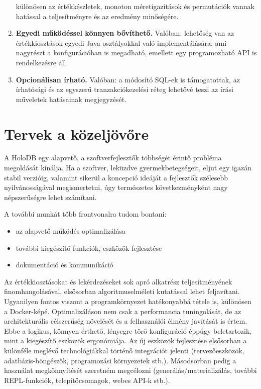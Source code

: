 \documentclass[
    parspace,
    noindent,
    nohyp,
]{elteiktdk}[2023/04/10]
\begin{document}
\begin{enumerate}
          különösen az értékkészletek, monoton méretigazítások és permutációk
          vannak hatással a teljesítményre és az eredmény minőségére.
    \item \textbf{Egyedi működéssel könnyen bővíthető.} Valóban:
          lehetőség van az értékkiosztások egyedi Java osztályokkal való implementálására,
          ami nagyrészt a konfigurációban is megadható,
          emellett egy programozható API is rendelkezésre áll.
    \item \textbf{Opcionálisan írható.} Valóban:
          a módosító SQL-ek is támogatottak,
          az írhatósági és az egyszerű tranzakciókezelési réteg
          lehetővé teszi az írási műveletek hatásainak megjegyzését.
\end{enumerate}


\section{Tervek a közeljövőre}

A HoloDB egy alapvető, a szoftverfejlesztők többségét érintő probléma megoldását kínálja.
Ha a szoftver, leküzdve gyermekbetegségeit, eljut egy igazán stabil verzióig,
valamint sikerül a koncepció ideáját a fejlesztők szélesebb nyilvánosságával megismertetni,
úgy természetes következményként nagy népszerűségre lehet számítani.

A további munkát több frontvonalra tudom bontani:

\begin{itemize}
    \item az alapvető működés optimalizálása
    \item további kiegészítő funkciók, eszközök fejlesztése
    \item dokumentáció és kommunikáció
\end{itemize}

Az értékkiosztásokat és lekérdezéseket sok apró alkatrész teljesítményének finomhangolásával,
elsősorban algoritmuselméleti kutatással lehet feljavítani.
Ugyanilyen fontos viszont a programkörnyezet hatékonyabbá tétele is,
különösen a Docker-képé.
Optimalizáláson nem csak a performancia tuningolását,
de az architekturális célszerűség növelését és a felhasználói élmény javítását is értem.
Ebbe a logikus, könnyen érthető, lényegre törő konfiguráció éppúgy beletartozik,
mint a kiegészítő eszközök ergonómiája.
Az új eszközök fejlesztése elsősorban a különféle meglévő technológiákkal történő integrációt jelenti
(tervezőeszközök, adatbázis-böngészők, programozási környezetek stb.).
Másodsorban pedig a használat megkönnyítését szeretném megcélozni
(generálás/materializálás, további REPL-funkciók, telepítőcsomagok, webes API-k stb.).
\end{document}
